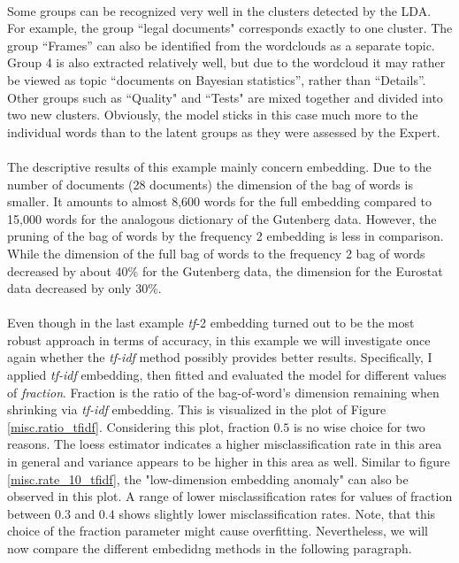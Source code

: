 \documentclass[11pt,a4paper]{article}
\begin{document}
\ \\
Some groups can be recognized very well in the clusters detected by the LDA. For example, the group ``legal documents" corresponds exactly to one cluster. The group “Frames” can also be identified from the wordclouds as a separate topic. Group 4 is also extracted relatively well, but due to the wordcloud it may rather be viewed as topic “documents on Bayesian statistics”, rather than “Details”. Other groups such as ``Quality" and ``Tests" are mixed together and divided into two new clusters. Obviously, the model sticks in this case much more to the individual words than to the latent groups as they were assessed by the Expert.\\
\ \\
The descriptive results of this example mainly concern embedding. Due to the number of documents (28 documents) the dimension of the bag of words is smaller. It amounts to almost 8,600 words for the full embedding compared to 15,000 words for the analogous dictionary of the Gutenberg data. However, the pruning of the bag of words by the frequency 2 embedding is less in comparison. While the dimension of the full bag of words to the frequency 2 bag of words decreased by about 40\% for the Gutenberg data, the dimension for the Eurostat data decreased by only 30\%.\\
\ \\
Even though in the last example \textit{tf}-2 embedding turned out to be the most robust approach in terms of accuracy, in this example we will investigate once again whether the \textit{tf-idf} method possibly provides better results. Specifically, I applied \textit{tf-idf} embedding, then fitted and evaluated the model for different values of \textit{fraction}. Fraction is the ratio of the bag-of-word’s dimension remaining when shrinking via \textit{tf-idf} embedding. This is visualized in the plot of Figure \ref{misc.ratio_tfidf}. Considering this plot, fraction $0.5$ is no wise choice for two reasons. The loess estimator indicates a higher misclassification rate in this area in general and variance appears to be higher in this area as well. Similar to figure \ref{misc.rate_10_tfidf}, the "low-dimension embedding anomaly" can also be observed in this plot. A range of lower misclassification rates for values of fraction between $0.3$ and $0.4$ shows slightly lower misclassification rates. Note, that this choice of the fraction parameter might cause overfitting. Nevertheless, we will now compare the different embedidng methods in the following paragraph.\\
\end{document}
